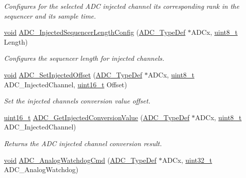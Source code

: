 \begin{DoxyCompactItemize}
\begin{DoxyCompactList}\small\item\em Configures for the selected A\+DC injected channel its corresponding rank in the sequencer and its sample time. \end{DoxyCompactList}\item 
\hyperlink{usb__devapi_8h_afabf60e7f57651d6d595a02c75f07cd0}{void} \hyperlink{group___a_d_c___exported___functions_ga24eba90bc3ee955e07659a605011710d}{A\+D\+C\+\_\+\+Injected\+Sequencer\+Length\+Config} (\hyperlink{struct_a_d_c___type_def}{A\+D\+C\+\_\+\+Type\+Def} $\ast$A\+D\+Cx, \hyperlink{_p_e___types_8h_aba7bc1797add20fe3efdf37ced1182c5}{uint8\+\_\+t} Length)
\begin{DoxyCompactList}\small\item\em Configures the sequencer length for injected channels. \end{DoxyCompactList}\item 
\hyperlink{usb__devapi_8h_afabf60e7f57651d6d595a02c75f07cd0}{void} \hyperlink{group___a_d_c___exported___functions_ga07a942613088ab3ecfc3d97a20475920}{A\+D\+C\+\_\+\+Set\+Injected\+Offset} (\hyperlink{struct_a_d_c___type_def}{A\+D\+C\+\_\+\+Type\+Def} $\ast$A\+D\+Cx, \hyperlink{_p_e___types_8h_aba7bc1797add20fe3efdf37ced1182c5}{uint8\+\_\+t} A\+D\+C\+\_\+\+Injected\+Channel, \hyperlink{_p_e___types_8h_a1f1825b69244eb3ad2c7165ddc99c956}{uint16\+\_\+t} Offset)
\begin{DoxyCompactList}\small\item\em Set the injected channels conversion value offset. \end{DoxyCompactList}\item 
\hyperlink{_p_e___types_8h_a1f1825b69244eb3ad2c7165ddc99c956}{uint16\+\_\+t} \hyperlink{group___a_d_c___exported___functions_ga1dea5ed24571a2e0ce4cbd41c9c1ec46}{A\+D\+C\+\_\+\+Get\+Injected\+Conversion\+Value} (\hyperlink{struct_a_d_c___type_def}{A\+D\+C\+\_\+\+Type\+Def} $\ast$A\+D\+Cx, \hyperlink{_p_e___types_8h_aba7bc1797add20fe3efdf37ced1182c5}{uint8\+\_\+t} A\+D\+C\+\_\+\+Injected\+Channel)
\begin{DoxyCompactList}\small\item\em Returns the A\+DC injected channel conversion result. \end{DoxyCompactList}\item 
\hyperlink{usb__devapi_8h_afabf60e7f57651d6d595a02c75f07cd0}{void} \hyperlink{group___a_d_c___exported___functions_gad017d69bec6e497afd35ba25ea22d86e}{A\+D\+C\+\_\+\+Analog\+Watchdog\+Cmd} (\hyperlink{struct_a_d_c___type_def}{A\+D\+C\+\_\+\+Type\+Def} $\ast$A\+D\+Cx, \hyperlink{_p_e___types_8h_a33594304e786b158f3fb30289278f5af}{uint32\+\_\+t} A\+D\+C\+\_\+\+Analog\+Watchdog)

\end{DoxyCompactItemize}
